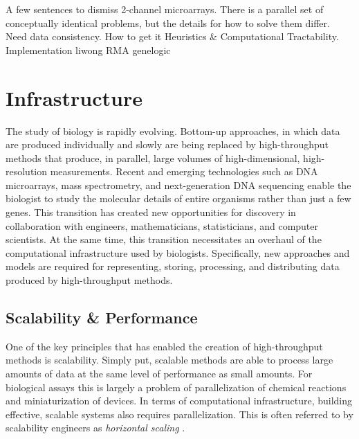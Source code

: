 A few sentences to dismiss 2-channel microarrays.  There is a parallel set of conceptually identical problems, but the details for how to solve them differ.
Need data consistency.  How to get it
Heuristics \& Computational Tractability.  Implementation
liwong			\cite{PMID_11134512,PMID_11532216}
RMA			\cite{PMID_12582260,PMID_12925520}
genelogic		\cite{PMID_17059591}

\section{Infrastructure}
\label{Infrastructure}

The study of biology is rapidly evolving.  Bottom-up approaches, in which data
are produced individually and slowly are being replaced by high-throughput
methods that produce, in parallel, large volumes of high-dimensional,
high-resolution measurements.  Recent and emerging technologies such as DNA
microarrays, mass spectrometry, and next-generation DNA sequencing enable the
biologist to study the molecular details of entire organisms rather than just a
few genes.  This transition has created new opportunities for discovery in
collaboration with engineers, mathematicians, statisticians, and computer
scientists.  At the same time, this transition necessitates an overhaul of the
computational infrastructure used by biologists.  Specifically, new approaches and
models are required for representing, storing, processing, and distributing
data produced by high-throughput methods.

\subsection{Scalability \& Performance}
\label{Scalability}

One of the key principles that has enabled the creation of high-throughput
methods is scalability.  Simply put, scalable methods are able to process large
amounts of data at the same level of performance as small amounts.  For
biological assays this is largely a problem of parallelization of chemical
reactions and miniaturization of devices.  In terms of computational
infrastructure, building effective, scalable systems also requires
parallelization.  This is often referred to by scalability engineers as
\emph{horizontal scaling} \cite{schlossnagle2006,arlitt2001}.

